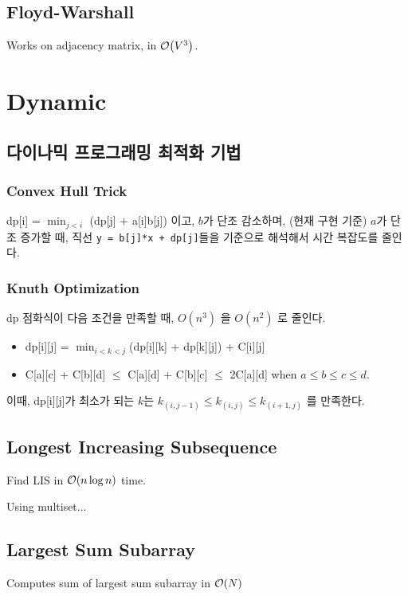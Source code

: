 \documentclass[landscape,8pt]{article}
\begin{document}
\begin{multicols}{2}
  \subsection{Floyd-Warshall}
    Works on adjacency matrix, in $\order{V^3}$.
      


\section{Dynamic}
  \subsection{다이나믹 프로그래밍 최적화 기법}
  \subsubsection{Convex Hull Trick}
    dp[i] = $\min_{j < i}$ (dp[j] + a[i]b[j]) 이고, $b$가 단조 감소하며, (현재 구현 기준) $a$가 단조 증가할 때, 직선 \texttt{y = b[j]*x + dp[j]}들을 기준으로 해석해서 시간 복잡도를 줄인다.
    
  \subsubsection{Knuth Optimization}
    dp 점화식이 다음 조건을 만족할 때, $O(n^3)$ 을 $O(n^2)$ 로 줄인다.
    \begin{itemize}
      \item dp[i][j] = $\min_{i < k < j}$(dp[i][k] + dp[k][j]) + C[i][j]
      \item C[a][c] + C[b][d] $\leq$ C[a][d] + C[b][c] $\leq$ 2C[a][d] when $a \leq b \leq c \leq d$.
    \end{itemize}
    이때, dp[i][j]가 최소가 되는 $k$는 $k_{(i, j-1)} \leq k_{(i, j)} \leq k_{(i+1, j)}$ 를 만족한다.
      
  \subsection{Longest Increasing Subsequence}
    Find LIS in $\order{n \log n}$ time.
      
    Using multiset...
      
  \subsection{Largest Sum Subarray}
    Computes sum of largest sum subarray in $\order{N}$
      


\end{multicols}
\end{document}
